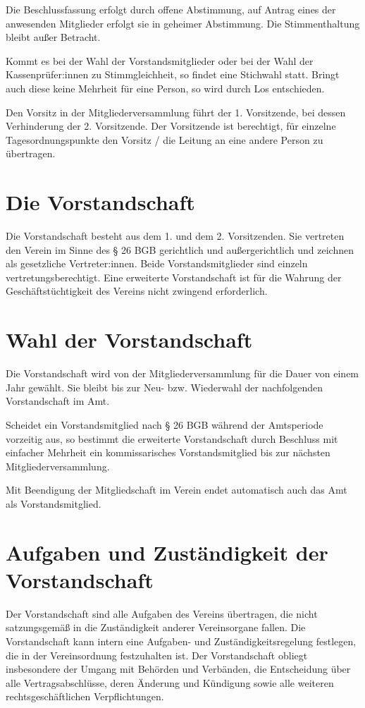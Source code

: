 \documentclass[10pt,a4paper]{article}
\begin{document}
Die Beschlussfassung erfolgt durch offene Abstimmung, auf Antrag eines der anwesenden Mitglieder erfolgt sie
in geheimer Abstimmung. Die Stimmenthaltung bleibt außer Betracht.

Kommt es bei der Wahl der Vorstandsmitglieder oder bei der Wahl der Kassenprüfer:innen zu Stimmgleichheit,
so findet eine Stichwahl statt. Bringt auch diese keine Mehrheit für eine Person, so wird durch Los entschieden.

Den Vorsitz in der Mitgliederversammlung führt der 1. Vorsitzende, bei dessen Verhinderung der 2.
Vorsitzende. Der Vorsitzende ist berechtigt, für einzelne Tagesordnungspunkte den Vorsitz / die Leitung an eine
andere Person zu übertragen.
\section{Die Vorstandschaft}
Die Vorstandschaft besteht aus dem 1. und dem 2. Vorsitzenden. Sie vertreten den Verein im Sinne des § 26
BGB gerichtlich und außergerichtlich und zeichnen als gesetzliche Vertreter:innen. Beide Vorstandsmitglieder
sind einzeln vertretungsberechtigt. Eine erweiterte Vorstandschaft ist für die Wahrung der Geschäftstüchtigkeit
des Vereins nicht zwingend erforderlich.
\section{Wahl der Vorstandschaft}
Die Vorstandschaft wird von der Mitgliederversammlung für die Dauer von einem Jahr gewählt. Sie bleibt bis
zur Neu- bzw. Wiederwahl der nachfolgenden Vorstandschaft im Amt. 

Scheidet ein Vorstandsmitglied nach § 26 BGB während der Amtsperiode vorzeitig aus, so bestimmt die
erweiterte Vorstandschaft durch Beschluss mit einfacher Mehrheit ein kommissarisches Vorstandsmitglied bis
zur nächsten Mitgliederversammlung.

Mit Beendigung der Mitgliedschaft im Verein endet automatisch auch das Amt als Vorstandsmitglied.
\section{Aufgaben und Zuständigkeit der Vorstandschaft}
Der Vorstandschaft sind alle Aufgaben des Vereins übertragen, die nicht satzungsgemäß in die Zuständigkeit
anderer Vereinsorgane fallen. Die Vorstandschaft kann intern eine Aufgaben- und Zuständigkeitsregelung
festlegen, die in der Vereinsordnung festzuhalten ist. Der Vorstandschaft obliegt insbesondere der Umgang mit
Behörden und Verbänden, die Entscheidung über alle Vertragsabschlüsse, deren Änderung und Kündigung
sowie alle weiteren rechtsgeschäftlichen Verpflichtungen.
\end{document}
